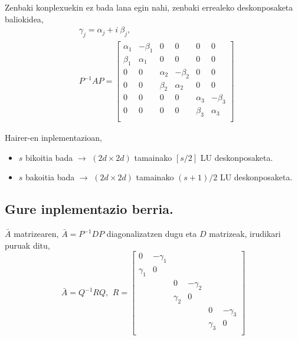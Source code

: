 \begin{enumerate}
Zenbaki konplexuekin ez bada lana egin nahi, zenbaki errealeko deskonposaketa baliokidea,
\begin{align*}
&\gamma_j=\alpha_j + i \ \beta_j,\\
&P^{-1}AP=\begin{bmatrix}
\alpha_{1} & -\beta_{1}   &  0            &  0            &  0           &    0       \\
\beta_{1}  & \alpha_{1}   & 0             &  0            &  0           &    0       \\
 0          & 0             & \alpha_{2}  & -\beta_{2}    &  0           &    0       \\
 0          & 0             & \beta_{2}   & \alpha_{2}    &  0           &    0       \\
 0          & 0             &  0          & 0             & \alpha_{3}  & -\beta_{3}  \\
 0          & 0             &  0          & 0             & \beta_{3}   & \alpha_{3}  \\
\end{bmatrix}
\end{align*}

\end{enumerate}

Hairer-en inplementazioan,
\begin{itemize}
\item $s$ bikoitia bada $\rightarrow$ $(2d \times 2d)$ tamainako $[s/2]$  LU deskonposaketa.
\item $s$ bakoitia bada $\rightarrow$ $(2d \times 2d)$ tamainako $(s+1)/2$  LU deskonposaketa.
\end{itemize}

\subsection*{Gure inplementazio berria.}

$\bar{A}$ matrizearen, $\bar{A}=P^{-1}DP$ diagonalizatzen dugu eta $D$ matrizeak, irudikari puruak ditu,
\begin{equation*}
\bar{A}=Q^{-1}RQ, \ \,
R=\begin{bmatrix}
0           & -\gamma_{1}   &            &               &             &           \\
 \gamma_{1} & 0             &            &               &             &           \\
            &               & 0           & -\gamma_{2}  &             &           \\
            &               & \gamma_{2}  & 0              &           &           \\
            &               &             &                & 0            & -\gamma_{3} \\
            &               &             &                & \gamma_{3}   & 0            \\
\end{bmatrix}
\end{equation*}

